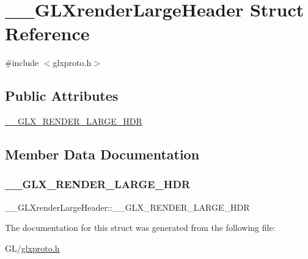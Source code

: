 \hypertarget{struct_____g_l_xrender_large_header}{}\section{\+\_\+\+\_\+\+G\+L\+Xrender\+Large\+Header Struct Reference}
\label{struct_____g_l_xrender_large_header}


{\ttfamily \#include $<$glxproto.\+h$>$}

\subsection*{Public Attributes}
\begin{DoxyCompactItemize}
\item 
\hyperlink{struct_____g_l_xrender_large_header_a2e585ffb5ad81a79b1bfc3618a5c4d36}{\+\_\+\+\_\+\+G\+L\+X\+\_\+\+R\+E\+N\+D\+E\+R\+\_\+\+L\+A\+R\+G\+E\+\_\+\+H\+DR}
\end{DoxyCompactItemize}


\subsection{Member Data Documentation}
\mbox{\label{struct_____g_l_xrender_large_header_a2e585ffb5ad81a79b1bfc3618a5c4d36}} 
\subsubsection{\texorpdfstring{\+\_\+\+\_\+\+G\+L\+X\+\_\+\+R\+E\+N\+D\+E\+R\+\_\+\+L\+A\+R\+G\+E\+\_\+\+H\+DR}{\_\_GLX\_RENDER\_LARGE\_HDR}}
{\footnotesize\ttfamily \+\_\+\+\_\+\+G\+L\+Xrender\+Large\+Header\+::\+\_\+\+\_\+\+G\+L\+X\+\_\+\+R\+E\+N\+D\+E\+R\+\_\+\+L\+A\+R\+G\+E\+\_\+\+H\+DR}



The documentation for this struct was generated from the following file\+:\begin{DoxyCompactItemize}
\item 
G\+L/\hyperlink{glxproto_8h}{glxproto.\+h}\end{DoxyCompactItemize}
